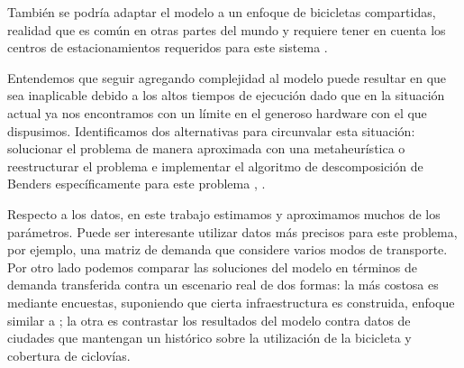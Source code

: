 También se podría adaptar el modelo a un enfoque de bicicletas compartidas, realidad que es común en otras partes del mundo y requiere tener en cuenta los centros de estacionamientos requeridos para este sistema \parencite{vogel2016}.

Entendemos que seguir agregando complejidad al modelo puede resultar en que sea inaplicable debido a los altos tiempos de ejecución dado que en la situación actual ya nos encontramos con un límite en el generoso hardware con el que dispusimos. Identificamos dos alternativas para circunvalar esta situación: solucionar el problema de manera aproximada con una metaheurística o reestructurar el problema e implementar el algoritmo de descomposición de Benders específicamente para este problema \parencite{bucarey2022}, \parencite{crainic2021}.

Respecto a los datos, en este trabajo estimamos y aproximamos muchos de los parámetros. Puede ser interesante utilizar datos más precisos para este problema, por ejemplo, una matriz de demanda que considere varios modos de transporte. Por otro lado podemos comparar las soluciones del modelo en términos de demanda transferida contra un escenario real de dos formas: la más costosa es mediante encuestas, suponiendo que cierta infraestructura es construida, enfoque similar a \textcite{shwe2014}; la otra es contrastar los resultados del modelo contra datos de ciudades que mantengan un histórico sobre la utilización de la bicicleta y cobertura de ciclovías.
